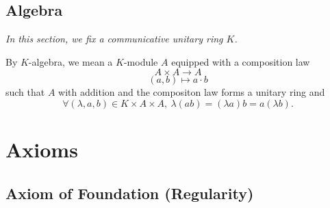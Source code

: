 \documentclass{book}
\numberwithin{equation}{section}
\begin{document}
\section{Algebra}
\textit{In this section, we fix a communicative unitary ring $K$.}
\begin{definitionenv}
    By $K$-algebra, we mean a $K$-module $A$ equipped with a composition law 
    $$A\times A\longrightarrow A$$
    $$(a,b)\longmapsto a\cdot b$$
    such that $A$ with addition and the compositon law forms a unitary ring and
    $$\forall (\lambda,a,b)\in K\times A\times A,\ \lambda\left(ab\right)=\left(\lambda a\right)b=a\left(\lambda b\right).$$
\end{definitionenv}





\appendix












\chapter{Axioms}

\section{Axiom of Foundation (Regularity)}
\end{document}
